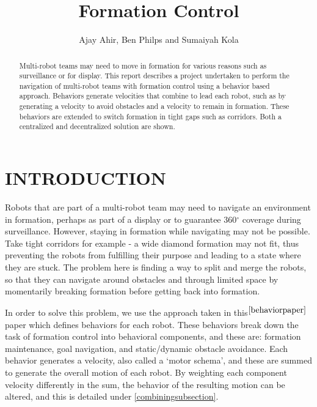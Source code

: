 \documentclass[letterpaper, 10 pt, conference]{ieeeconf}  %
\title{\LARGE \bf Formation Control}
\author{Ajay Ahir, Ben Philps and Sumaiyah Kola}
\begin{document}
\maketitle
\thispagestyle{empty}
\pagestyle{empty}

\begin{abstract}

Multi-robot teams may need to move in formation for various reasons such as surveillance or for display. This report describes a project undertaken to perform the navigation of multi-robot teams with formation control using a behavior based approach. Behaviors generate velocities that combine to lead each robot, such as by generating a velocity to avoid obstacles and a velocity to remain in formation. These behaviors are extended to switch formation in tight gaps such as corridors. Both a centralized and decentralized solution are shown.

\end{abstract}

\section{INTRODUCTION}
\label{introductionsection}

Robots that are part of a multi-robot team may need to navigate an environment in formation, perhaps as part of a display or to guarantee 360$^{\circ}$ coverage during surveillance. However, staying in formation while navigating may not be possible. Take tight corridors for example - a wide diamond formation may not fit, thus preventing the robots from fulfilling their purpose and leading to a state where they are stuck. The problem here is finding a way to split and merge the robots, so that they can navigate around obstacles and through limited space by momentarily breaking formation before getting back into formation.

In order to solve this problem, we use the approach taken in this$^{\cite{behaviorpaper}}$ paper which defines behaviors for each robot. These behaviors break down the task of formation control into behavioral components, and these are: formation maintenance, goal navigation, and static/dynamic obstacle avoidance. Each behavior generates a velocity, also called a `motor schema', and these are summed to generate the overall motion of each robot. By weighting each component velocity differently in the sum, the behavior of the resulting motion can be altered, and this is detailed under \ref{combiningsubsection}.
\end{document}
